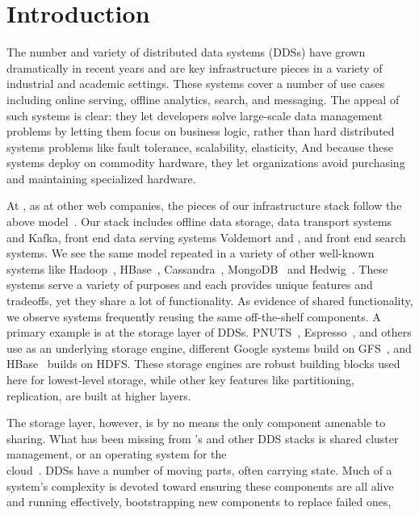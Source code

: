 \section{Introduction}
\label{sec:intro}
%
The number and variety of distributed data systems (DDSs) have grown
dramatically in recent years and are key infrastructure pieces in a variety of
industrial and academic settings.    
These systems cover a number of use cases including online serving,
offline analytics, search, and messaging.  The 
appeal of such systems is clear: they let developers solve large-scale data 
management problems by letting them focus on business logic, rather than hard distributed systems problems
like fault tolerance, scalability, elasticity, \etc   And because these systems
deploy on commodity hardware, they let organizations avoid purchasing and
maintaining specialized hardware. 
 
At \linkedin, as at other web companies, the pieces of our infrastructure stack follow the above 
model~\cite{linkedin12}.  Our stack includes offline data storage, data
transport systems \databus and Kafka, front end data serving systems Voldemort
and \ES, and front end search systems.  We see the same model repeated in a
variety of other well-known systems like
Hadoop~\cite{hadoop}, HBase~\cite{hbase}, Cassandra~\cite{cassandra},
MongoDB~\cite{mongodb} and Hedwig~\cite{hedwig}.  
These systems serve a variety of purposes and each provides unique features and tradeoffs, yet 
they share a lot of functionality.  As evidence of shared functionality, we
observe systems frequently reusing the same off-the-shelf components.  A primary
example is at the storage layer of DDSs.
PNUTS~\cite{cooper08}, Espresso~\cite{linkedin12}, and others use \mysql 
as an underlying storage engine, different Google systems build on
GFS~\cite{chang06, shute12}, and HBase~\cite{hbase} builds on HDFS.  These storage
engines are robust building blocks used here for lowest-level storage, while
other key features like partitioning, replication, \etc are built at higher layers.  

The storage layer, however, is by no means the only component amenable to
sharing.  What has been missing from \linkedin's and other DDS stacks is shared
cluster management, or an operating system for the 
\\ cloud~\cite{zaharia11}.
DDSs have a number of moving parts, often carrying state.  Much of a
system's complexity is devoted toward ensuring these components are all alive
and running effectively, bootstrapping new components to replace failed ones, \etc  

